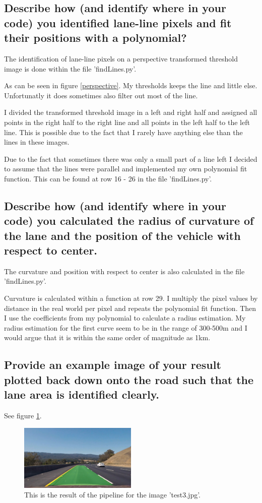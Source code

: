 \documentclass[12pt,a4paper]{article}
\begin{document}
\subsection{Describe how (and identify where in your code) you identified lane-line pixels and fit their positions with a polynomial?}
The identification of lane-line pixels on a perspective transformed threshold image is done within the file 'findLines.py'.

As can be seen in figure \ref{perspective}. My thresholds keeps the line and little else. Unfortunatly it does sometimes also filter out most of the line. 

I divided the transformed threshold image in a left and right half and assigned all points in the right half to the right line and all points in the left half to the left line. This is possible due to the fact that I rarely have anything else than the lines in these images.

Due to the fact that sometimes there was only a small part of a line left I decided to assume that the lines were parallel and implemented my own polynomial fit function. This can be found at row 16 - 26 in the file 'findLines.py'.


\subsection{Describe how (and identify where in your code) you calculated the radius of curvature of the lane and the position of the vehicle with respect to center.}
The curvature and position with respect to center is also calculated in the file 'findLines.py'.

Curvature is calculated within a function at row 29. I multiply the pixel values by distance in the real world per pixel and repeats the polynomial fit function. Then I use the coefficients from my polynomial to calculate a radius estimation. My radius estimation for the first curve seem to be in the range of 300-500m and I would argue that it is within the same order of magnitude as 1km.

\subsection{Provide an example image of your result plotted back down onto the road such that the lane area is identified clearly.}
See figure \ref{resultMappedToRoad}.
\begin{figure}
  \centering
    \includegraphics[width=0.5\textwidth]{../output_images/resultWithLines-test3.jpg}
    \caption{This is the result of the pipeline for the image 'test3.jpg'.}
    \label{resultMappedToRoad}
\end{figure}
\end{document}
